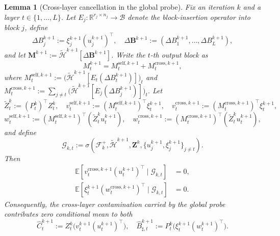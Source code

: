 \documentclass{pkumelon}
\theoremstyle{plain}
\newtheorem{lemma}{Lemma}
\newcommand{\R}{\mathbb{R}}
\newcommand{\E}{\mathbb{E}}
\begin{document}
\begin{lemma}[Cross-layer cancellation in the global probe]\label{lem:probe_cancellation}
Fix an iteration $k$ and a layer $t\in\{1,\ldots,L\}$. Let $E_j:\R^{r_j\times n_j}\to\mathcal B$ denote the block-insertion operator into block $j$, define
\begin{equation*}
\Delta B_j^{k+1}:=\xi_j^{k+1}(u_j^{k+1})^\top, \quad \Delta\boldsymbol B^{k+1}:=(\Delta B_1^{k+1},\ldots,\Delta B_L^{k+1}),
\end{equation*}
and let $\boldsymbol M^{k+1}:=\tilde{\mathcal H}^{k+1}[\Delta\boldsymbol B^{k+1}]$. Write the $t$-th output block as
\begin{equation*}
M_t^{k+1}=M_t^{\mathrm{self},k+1}+M_t^{\mathrm{cross},k+1},
\end{equation*}
where $M_t^{\mathrm{self},k+1}:=\bigl(\tilde{\mathcal H}^{k+1}[E_t(\Delta B_t^{k+1})]\bigr)_t$ and $M_t^{\mathrm{cross},k+1}:=\sum_{j\neq t}\bigl(\tilde{\mathcal H}^{k+1}[E_j(\Delta B_j^{k+1})]\bigr)_t$. Let
\begin{equation*}
\tilde Z_t^k:=(P_t^k)^\top Z_t^k, \quad v_t^{\mathrm{self},k+1}:=(M_t^{\mathrm{self},k+1})^\top\xi_t^{k+1}, \quad v_t^{\mathrm{cross},k+1}:=(M_t^{\mathrm{cross},k+1})^\top\xi_t^{k+1},
\end{equation*}
\begin{equation*}
w_t^{\mathrm{self},k+1}:=(M_t^{\mathrm{self},k+1})^\top(\tilde Z_t^k u_t^{k+1}), \quad w_t^{\mathrm{cross},k+1}:=(M_t^{\mathrm{cross},k+1})^\top(\tilde Z_t^k u_t^{k+1}),
\end{equation*}
and define
\begin{equation*}
\mathcal G_{k,t}:=\sigma\!\left(\mathcal F_k^+,\tilde{\mathcal H}^{k+1},\boldsymbol Z^k,\{u_j^{k+1},\xi_j^{k+1}\}_{j\neq t}\right).
\end{equation*}
Then
\begin{subequations}\label{eq:cross_probe_cancel}
\begin{align}
\E\!\left[v_t^{\mathrm{cross},k+1}(u_t^{k+1})^\top\mid \mathcal G_{k,t}\right]&=0, \label{eq:cross_probe_cancel_trace}\\
\E\!\left[\xi_t^{k+1}(w_t^{\mathrm{cross},k+1})^\top\mid \mathcal G_{k,t}\right]&=0. \label{eq:cross_probe_cancel_sharp}
\end{align}
\end{subequations}
Consequently, the cross-layer contamination carried by the global probe contributes zero conditional mean to both
\begin{equation*}
\widehat C_t^{k+1}:=Z_t^k\bigl(v_t^{k+1}(u_t^{k+1})^\top\bigr), \quad \widehat B_{\sharp,t}^{k+1}:=P_t^k\bigl(\xi_t^{k+1}(w_t^{k+1})^\top\bigr).
\end{equation*}
\end{lemma}
\end{document}
